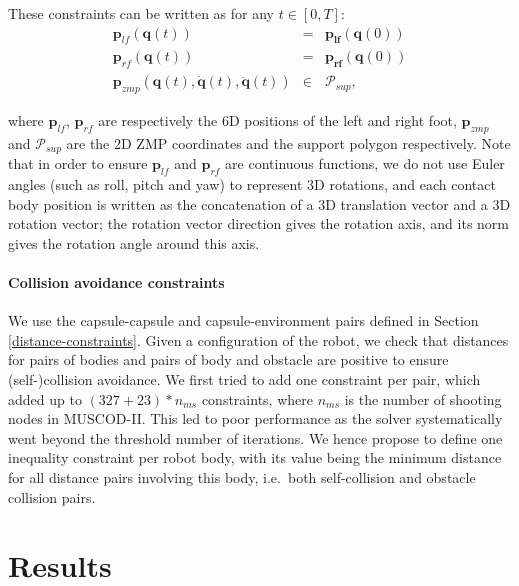 These constraints can be written as for any $t\in[0,T]$:
\begin{equation}
  \begin{array}{rcl}
    \mathbf{p}_{lf}(\mathbf{q}(t)) & = & \mathbf{p_{lf}}(\mathbf{q}(0)) \\
    \mathbf{p}_{rf}(\mathbf{q}(t)) & = & \mathbf{p_{rf}}(\mathbf{q}(0)) \\
    \mathbf{p}_{zmp} (\mathbf{q}(t), \mathbf{\dot{q}}(t), \mathbf{\ddot{q}}(t)) & \in & \mathcal{P}_{sup},
  \end{array}
  \label{dynamic-constraints}
\end{equation}

\noindent where $\mathbf{p}_{lf}$, $\mathbf{p}_{rf}$ are respectively the 6D
positions of the left and right foot, $\mathbf{p}_{zmp}$ and
$\mathcal{P}_{sup}$ are the 2D ZMP coordinates and the support polygon
respectively. Note that in order to ensure $\mathbf{p}_{lf}$ and
$\mathbf{p}_{rf}$ are continuous functions, we do not use Euler angles
(such as roll, pitch and yaw) to represent 3D rotations, and each
contact body position is written as the concatenation of a 3D
translation vector and a 3D rotation vector; the rotation vector
direction gives the rotation axis, and its norm gives the rotation
angle around this axis.

\paragraph{Collision avoidance constraints}
We use the capsule-capsule and capsule-\linebreak environment pairs
defined in Section \ref{distance-constraints}. Given a configuration
\config{} of the robot, we check that distances for pairs of bodies
and pairs of body and obstacle are positive to ensure (self-)collision
avoidance. We first tried to add one constraint per pair, which added
up to $(327 + 23)*n_{ms}$ constraints, where $n_{ms}$ is the number of
shooting nodes in \textsc{MUSCOD-II}. This led to poor performance as
the solver systematically went beyond the threshold number of
iterations. We hence propose to define one inequality constraint per
robot body, with its value being the minimum distance for all distance
pairs involving this body, i.e.\ both self-collision and obstacle
collision pairs.

\section{Results}
\label{results}

